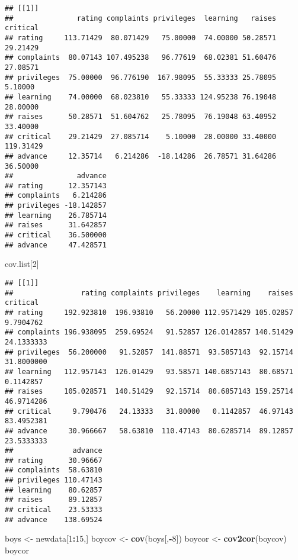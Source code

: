 \documentclass[]{article}
\newenvironment{Shaded}{\begin{snugshade}}{\end{snugshade}}
\newcommand{\KeywordTok}[1]{\textcolor[rgb]{0.13,0.29,0.53}{\textbf{#1}}}
\newcommand{\DecValTok}[1]{\textcolor[rgb]{0.00,0.00,0.81}{#1}}
\newcommand{\StringTok}[1]{\textcolor[rgb]{0.31,0.60,0.02}{#1}}
\newcommand{\OperatorTok}[1]{\textcolor[rgb]{0.81,0.36,0.00}{\textbf{#1}}}
\newcommand{\NormalTok}[1]{#1}
\begin{document}
\begin{verbatim}
## [[1]]
##               rating complaints privileges  learning   raises  critical
## rating     113.71429  80.071429   75.00000  74.00000 50.28571  29.21429
## complaints  80.07143 107.495238   96.77619  68.02381 51.60476  27.08571
## privileges  75.00000  96.776190  167.98095  55.33333 25.78095   5.10000
## learning    74.00000  68.023810   55.33333 124.95238 76.19048  28.00000
## raises      50.28571  51.604762   25.78095  76.19048 63.40952  33.40000
## critical    29.21429  27.085714    5.10000  28.00000 33.40000 119.31429
## advance     12.35714   6.214286  -18.14286  26.78571 31.64286  36.50000
##               advance
## rating      12.357143
## complaints   6.214286
## privileges -18.142857
## learning    26.785714
## raises      31.642857
## critical    36.500000
## advance     47.428571
\end{verbatim}

\begin{Shaded}
\begin{Highlighting}[]
\NormalTok{cov.list[}\DecValTok{2}\NormalTok{]}
\end{Highlighting}
\end{Shaded}

\begin{verbatim}
## [[1]]
##                rating complaints privileges    learning    raises   critical
## rating     192.923810  196.93810   56.20000 112.9571429 105.02857  9.7904762
## complaints 196.938095  259.69524   91.52857 126.0142857 140.51429 24.1333333
## privileges  56.200000   91.52857  141.88571  93.5857143  92.15714 31.8000000
## learning   112.957143  126.01429   93.58571 140.6857143  80.68571  0.1142857
## raises     105.028571  140.51429   92.15714  80.6857143 159.25714 46.9714286
## critical     9.790476   24.13333   31.80000   0.1142857  46.97143 83.4952381
## advance     30.966667   58.63810  110.47143  80.6285714  89.12857 23.5333333
##              advance
## rating      30.96667
## complaints  58.63810
## privileges 110.47143
## learning    80.62857
## raises      89.12857
## critical    23.53333
## advance    138.69524
\end{verbatim}

\begin{Shaded}
\begin{Highlighting}[]
\NormalTok{boys <-}\StringTok{ }\NormalTok{newdata[}\DecValTok{1}\OperatorTok{:}\DecValTok{15}\NormalTok{,]}
\NormalTok{boycov <-}\StringTok{ }\KeywordTok{cov}\NormalTok{(boys[,}\OperatorTok{-}\DecValTok{8}\NormalTok{])}
\NormalTok{boycor <-}\StringTok{ }\KeywordTok{cov2cor}\NormalTok{(boycov)}
\NormalTok{boycor}
\end{Highlighting}
\end{Shaded}
\end{document}

